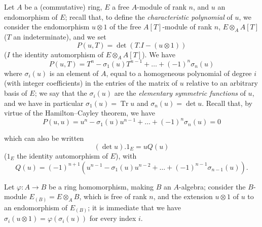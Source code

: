 \begin{env}[6.4.1]
\label{II.6.4.1}
Let $A$ be a (commutative) ring, $E$ a free $A$-module of rank $n$, and $u$
an endomorphism of $E$; recall that, to define the \emph{characteristic
polynomial} of $u$, we consider the endomorphism $u\otimes1$ of the free
$A[T]$-module of rank $n$, $E\otimes_AA[T]$ ($T$ an indeterminate), and we
set
\[
\label{II.6.4.1.1}
P(u,T)=\det(T.I-(u\otimes1))
\tag{6.4.1.1}
\]
($I$ the identity automorphism of $E\otimes_AA[T]$). We have
\[
\label{II.6.4.1.2}
P(u,T)=T^n-\sigma_1(u)T^{n-1}+\ldots+(-1)^n\sigma_n(u)
\tag{6.4.1.2}
\]
where $\sigma_i(u)$ is an element of $A$, equal to a homogeneous polynomial
of degree $i$ (with integer coefficients) in the entries of the matrix of
$u$ relative to an arbitrary basis of $E$; we say that the $\sigma_i(u)$ are
the \emph{elementary symmetric functions} of $u$, and we have in particular
$\sigma_1(u)=\operatorname{Tr}u$ and $\sigma_n(u)=\det u$. Recall that, by
virtue of the Hamilton--Cayley theorem, we have
\[
\label{II.6.4.1.3}
P(u,u)=u^n-\sigma_1(u)u^{n-1}+\ldots+(-1)^n\sigma_n(u)=0
\tag{6.4.1.3}
\]


which can also be written
\[
\label{II.6.4.1.4}
(\det u). 1_E=uQ(u)
\tag{6.4.1.4}
\]
($1_E$ the identity automorphism of $E$), with
\[
\label{II.6.4.1.5}
Q(u)=(-1)^{n+1}(u^{n-1}-\sigma_1(u)u^{n-2}+\ldots+(-1)^{n-1}\sigma_{n-1}(u)).
\tag{6.4.1.5}
\]

Let $\varphi:A\to B$ be a ring homomorphism, making $B$ an $A$-algebra;
consider the $B$-module $E_{(B)}=E\otimes_AB$, which is free of rank $n$,
and the extension $u\otimes1$ of $u$ to an endomorphism of $E_{(B)}$; it is
immediate that we have $\sigma_i(u\otimes1)=\varphi(\sigma_i(u))$ for every
index $i$.
\end{env}

